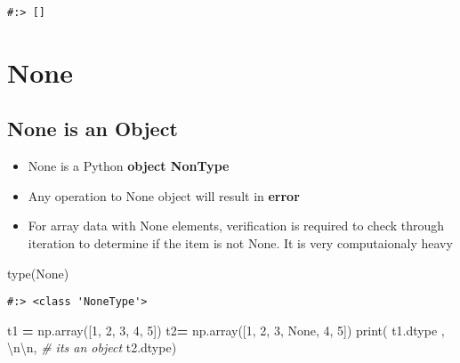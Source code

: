 \documentclass[
]{book}
\newenvironment{Shaded}{\begin{snugshade}}{\end{snugshade}}
\newcommand{\BuiltInTok}[1]{#1}
\newcommand{\CharTok}[1]{\textcolor[rgb]{0.5,0.5,0.5}{#1}}
\newcommand{\CommentTok}[1]{\textcolor[rgb]{0.37,0.37,0.37}{\textit{#1}}}
\newcommand{\DecValTok}[1]{\textcolor[rgb]{0.06,0.06,0.06}{#1}}
\newcommand{\NormalTok}[1]{#1}
\newcommand{\OperatorTok}[1]{\textcolor[rgb]{0.43,0.43,0.43}{\textbf{#1}}}
\newcommand{\StringTok}[1]{\textcolor[rgb]{0.5,0.5,0.5}{#1}}
\newcommand{\VariableTok}[1]{\textcolor[rgb]{0,0,0}{#1}}
\providecommand{\tightlist}{%
  \setlength{\itemsep}{0pt}\setlength{\parskip}{0pt}}
\begin{document}
\begin{verbatim}
#:> []
\end{verbatim}

\hypertarget{none}{%
\section{None}\label{none}}

\hypertarget{none-is-an-object}{%
\subsection{None is an Object}\label{none-is-an-object}}

\begin{itemize}
\tightlist
\item
  None is a Python \textbf{object NonType}\\
\item
  Any operation to None object will result in \textbf{error}\\
\item
  For array data with None elements, verification is required to check through iteration to determine if the item is not None. It is very computaionaly heavy
\end{itemize}

\begin{Shaded}
\begin{Highlighting}[]
\BuiltInTok{type}\NormalTok{(}\VariableTok{None}\NormalTok{)}
\end{Highlighting}
\end{Shaded}

\begin{verbatim}
#:> <class 'NoneType'>
\end{verbatim}

\begin{Shaded}
\begin{Highlighting}[]
\NormalTok{t1 }\OperatorTok{=}\NormalTok{ np.array([}\DecValTok{1}\NormalTok{, }\DecValTok{2}\NormalTok{, }\DecValTok{3}\NormalTok{, }\DecValTok{4}\NormalTok{, }\DecValTok{5}\NormalTok{])}
\NormalTok{t2}\OperatorTok{=}\NormalTok{ np.array([}\DecValTok{1}\NormalTok{, }\DecValTok{2}\NormalTok{, }\DecValTok{3}\NormalTok{, }\VariableTok{None}\NormalTok{, }\DecValTok{4}\NormalTok{, }\DecValTok{5}\NormalTok{])}
\BuiltInTok{print}\NormalTok{( t1.dtype  , }\StringTok{\textquotesingle{}}\CharTok{\textbackslash{}n\textbackslash{}n}\StringTok{\textquotesingle{}}\NormalTok{,    }\CommentTok{\# it\textquotesingle{}s an object}
\NormalTok{       t2.dtype)}
\end{Highlighting}
\end{Shaded}
\end{document}
